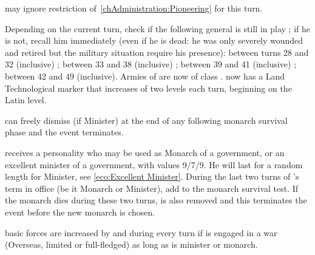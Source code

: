 \phadm
\aparag \ENG may ignore restriction of~\ref{chAdministration:Pioneering} for
this turn.





\phevnt
\aparag Depending on the current turn, check if the following general is still
in play ; if he is not, recall him immediately (even if he is dead: he was
only severely wounded and retired but the military situation require his
presence):
\bparag \leaderPappenheim between turns 28 and 32 (inclusive) ;
\bparag \leaderMontecuccoli between 33 and 38 (inclusive) ;
\bparag {} between 39 and 41 (inclusive) ;
\bparag {} between 42 and 49 (inclusive).
\aparag Armies of \AUSaus are now of class \CAIV.
\aparag \AUSMin now has a Land Technological marker that increases of two
levels each turn, beginning on the Latin level.





\aparag \HOL can freely dismiss  (if Minister) at the
end of any following monarch survival phase and the event terminates.

\phevnt
\aparag \HOL receives a personality  who may be used as
Monarch of a  government, or an excellent minister of a
 government, with values 9/7/9.  He will last for a random
length for Minister, see \ref{eco:Excellent Minister}.
\aparag During the last two turns of 's term in office (be
it Monarch or Minister), add  to the monarch survival test.  If the
monarch dies during these two turns,  is also removed and
this terminates the event before the new monarch is chosen.

\phadm
\aparag \HOL basic forces are increased by \FLEET\facemoins and \ARMY\faceplus
during every turn if is engaged in a war (Overseas, limited or full-fledged)
as long as  is minister or monarch.



